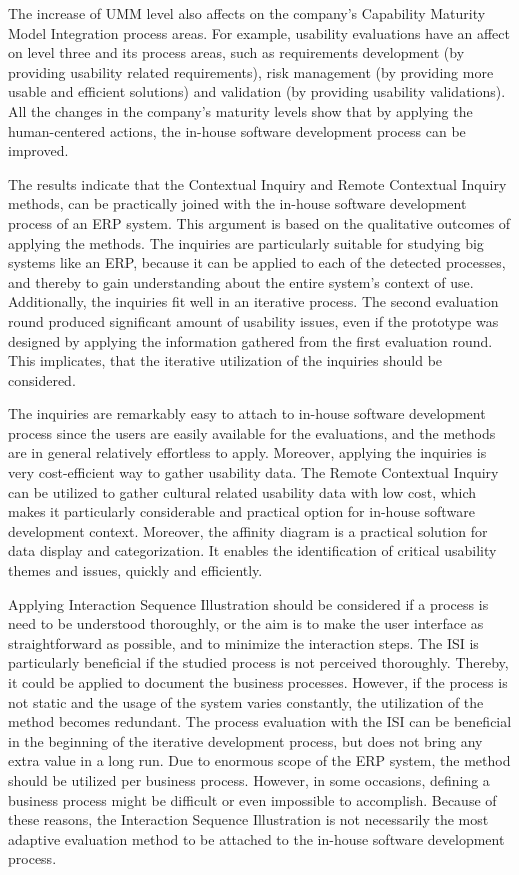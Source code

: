 \documentclass[12pt,a4paper,oneside,pdftex]{report}
\begin{document}
The increase of UMM level also affects on the company's Capability Maturity Model Integration process areas. For example, usability evaluations have an affect on level three and its process areas, such as requirements development (by providing usability related requirements), risk management (by providing more usable and efficient solutions) and validation (by providing usability validations). All the changes in the company's maturity levels show that by applying the human-centered actions, the in-house software development process can be improved.

The results indicate that the Contextual Inquiry and Remote Contextual Inquiry methods, can be practically joined with the in-house software development process of an ERP system. This argument is based on the qualitative outcomes of applying the methods. The inquiries are particularly suitable for studying big systems like an ERP, because it can be applied to each of the detected processes, and thereby to gain understanding about the entire system's context of use. Additionally, the inquiries fit well in an iterative process. The second evaluation round produced significant amount of usability issues, even if the prototype was designed by applying the information gathered from the first evaluation round. This implicates, that the iterative utilization of the inquiries should be considered. 

The inquiries are remarkably easy to attach to in-house software development process since the users are easily available for the evaluations, and the methods are in general relatively effortless to apply. Moreover, applying the inquiries is very cost-efficient way to gather usability data. The Remote Contextual Inquiry can be utilized to gather cultural related usability data with low cost, which makes it particularly considerable and practical option for in-house software development context. Moreover, the affinity diagram is a practical solution for data display and categorization. It enables the identification of critical usability themes and issues, quickly and efficiently.   

Applying Interaction Sequence Illustration should be considered if a process is need to be understood thoroughly, or the aim is to make the user interface as straightforward as possible, and to minimize the interaction steps. The ISI is particularly beneficial if the studied process is not perceived thoroughly. Thereby, it could be applied to document the business processes. However, if the process is not static and the usage of the system varies constantly, the utilization of the method becomes redundant. The process evaluation with the ISI can be beneficial in the beginning of the iterative development process, but does not bring any extra value in a long run. Due to enormous scope of the ERP system, the method should be utilized per business process. However, in some occasions, defining a business process might be difficult or even impossible to accomplish. Because of these reasons, the Interaction Sequence Illustration is not necessarily the most adaptive evaluation method to be attached to the in-house software development process.
\end{document}
